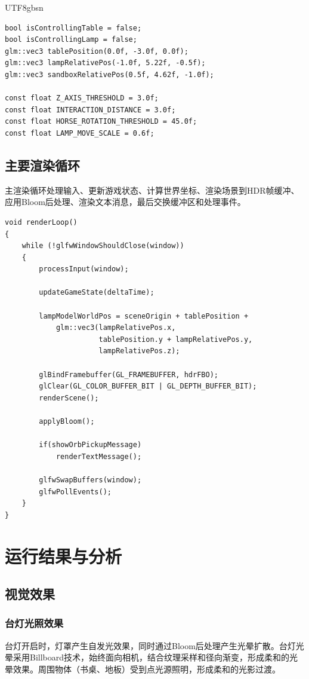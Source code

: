 \documentclass{article}
\begin{document}
\begin{CJK}{UTF8}{gbsn}
\begin{lstlisting}[caption=全局状态变量]
bool isControllingTable = false;
bool isControllingLamp = false;
glm::vec3 tablePosition(0.0f, -3.0f, 0.0f);
glm::vec3 lampRelativePos(-1.0f, 5.22f, -0.5f);
glm::vec3 sandboxRelativePos(0.5f, 4.62f, -1.0f);

const float Z_AXIS_THRESHOLD = 3.0f;
const float INTERACTION_DISTANCE = 3.0f;
const float HORSE_ROTATION_THRESHOLD = 45.0f;
const float LAMP_MOVE_SCALE = 0.6f;
\end{lstlisting}

\subsection{主要渲染循环}
主渲染循环处理输入、更新游戏状态、计算世界坐标、渲染场景到HDR帧缓冲、应用Bloom后处理、渲染文本消息，最后交换缓冲区和处理事件。

\begin{lstlisting}[caption=主渲染循环]
void renderLoop()
{
    while (!glfwWindowShouldClose(window))
    {
        processInput(window);
        
        updateGameState(deltaTime);
        
        lampModelWorldPos = sceneOrigin + tablePosition + 
            glm::vec3(lampRelativePos.x, 
                      tablePosition.y + lampRelativePos.y, 
                      lampRelativePos.z);
        
        glBindFramebuffer(GL_FRAMEBUFFER, hdrFBO);
        glClear(GL_COLOR_BUFFER_BIT | GL_DEPTH_BUFFER_BIT);
        renderScene();
        
        applyBloom();
        
        if(showOrbPickupMessage)
            renderTextMessage();
        
        glfwSwapBuffers(window);
        glfwPollEvents();
    }
}
\end{lstlisting}


\section{运行结果与分析}

\subsection{视觉效果}

\subsubsection{台灯光照效果}
台灯开启时，灯罩产生自发光效果，同时通过Bloom后处理产生光晕扩散。台灯光晕采用Billboard技术，始终面向相机，结合纹理采样和径向渐变，形成柔和的光晕效果。周围物体（书桌、地板）受到点光源照明，形成柔和的光影过渡。


\end{CJK}
\end{document}
